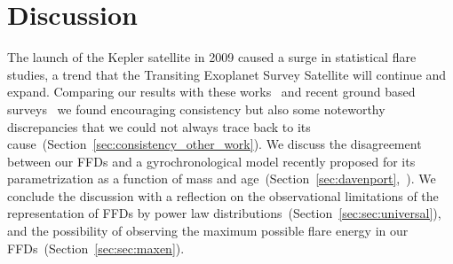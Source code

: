 \documentclass{aa}
\begin{document}
\section{Discussion}
\label{sec:discussion}
The launch of the Kepler satellite in 2009 caused a surge in statistical flare studies, a trend that the Transiting Exoplanet Survey Satellite will continue and expand. Comparing our results with these works~\citep{shibayama2013,lurie2015,lin2019,raetz2020} and recent ground based surveys~\citep{chang2015,howard2019} we found encouraging consistency but also some noteworthy discrepancies that we could not always trace back to its cause~(Section~\ref{sec:consistency_other_work}). We discuss the disagreement between our FFDs and a gyrochronological model recently proposed for its parametrization as a function of mass and age~(Section~\ref{sec:davenport},~\citealt{davenport2019}). We conclude the discussion with a reflection on the observational limitations of the representation of FFDs by power law distributions~(Section~\ref{sec:sec:universal}), and the possibility of observing the maximum possible flare energy in our FFDs~(Section~\ref{sec:sec:maxen}).
\end{document}
